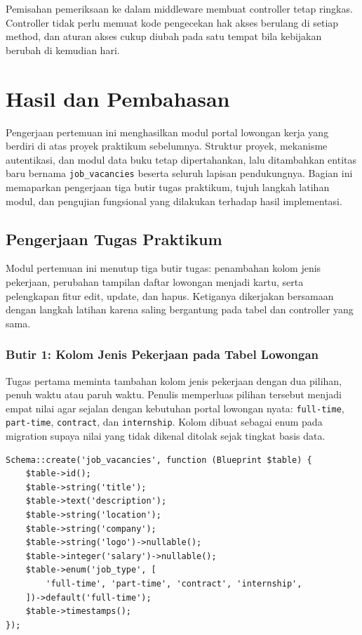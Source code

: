 \documentclass[12pt,a4paper]{article}
\begin{document}
Pemisahan pemeriksaan ke dalam middleware membuat controller tetap ringkas. Controller tidak perlu memuat kode pengecekan hak akses berulang di setiap method, dan aturan akses cukup diubah pada satu tempat bila kebijakan berubah di kemudian hari.

\section{Hasil dan Pembahasan}

Pengerjaan pertemuan ini menghasilkan modul portal lowongan kerja yang berdiri di atas proyek praktikum sebelumnya. Struktur proyek, mekanisme autentikasi, dan modul data buku tetap dipertahankan, lalu ditambahkan entitas baru bernama \texttt{job\_vacancies} beserta seluruh lapisan pendukungnya. Bagian ini memaparkan pengerjaan tiga butir tugas praktikum, tujuh langkah latihan modul, dan pengujian fungsional yang dilakukan terhadap hasil implementasi.

\subsection{Pengerjaan Tugas Praktikum}

Modul pertemuan ini menutup tiga butir tugas: penambahan kolom jenis pekerjaan, perubahan tampilan daftar lowongan menjadi kartu, serta pelengkapan fitur edit, update, dan hapus. Ketiganya dikerjakan bersamaan dengan langkah latihan karena saling bergantung pada tabel dan controller yang sama.

\subsubsection{Butir 1: Kolom Jenis Pekerjaan pada Tabel Lowongan}

Tugas pertama meminta tambahan kolom jenis pekerjaan dengan dua pilihan, penuh waktu atau paruh waktu. Penulis memperluas pilihan tersebut menjadi empat nilai agar sejalan dengan kebutuhan portal lowongan nyata: \texttt{full-time}, \texttt{part-time}, \texttt{contract}, dan \texttt{internship}. Kolom dibuat sebagai enum pada migration supaya nilai yang tidak dikenal ditolak sejak tingkat basis data.

\begin{lstlisting}[caption={Definisi kolom \texttt{job\_type} pada migration \texttt{create\_job\_vacancies\_table}}, label={lst:migrasi}]
Schema::create('job_vacancies', function (Blueprint $table) {
    $table->id();
    $table->string('title');
    $table->text('description');
    $table->string('location');
    $table->string('company');
    $table->string('logo')->nullable();
    $table->integer('salary')->nullable();
    $table->enum('job_type', [
        'full-time', 'part-time', 'contract', 'internship',
    ])->default('full-time');
    $table->timestamps();
});
\end{lstlisting}
\end{document}
